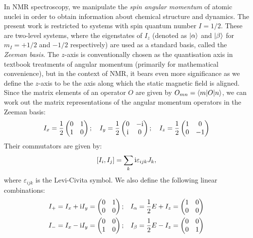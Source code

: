 In NMR spectroscopy, we manipulate the \textit{spin angular momentum} of atomic nuclei in order to obtain information about chemical structure and dynamics.
The present work is restricted to systems with spin quantum number $I = 1/2$.
These are two-level systems, where the eigenstates of $I_z$ (denoted as $\ket{\alpha}$ and $\ket{\beta}$ for $m_I = +1/2$ and $-1/2$ respectively) are used as a standard basis, called the \textit{Zeeman basis}.
The $z$-axis is conventionally chosen as the quantisation axis in textbook treatments of angular momentum (primarily for mathematical convenience), but in the context of NMR, it bears even more significance as we define the $z$-axis to be the axis along which the static magnetic field is aligned.
Since the matrix elements of an operator $O$ are given by $O_{mn} = \braket{m|O|n}$, we can work out the matrix representations of the angular momentum operators in the Zeeman basis:
\begin{equation}
    \label{eq:pauli}
    I_x = \frac{1}{2}\begin{pmatrix} 0 & 1 \\ 1 & 0 \end{pmatrix}; \quad 
    I_y = \frac{1}{2}\begin{pmatrix} 0 & -\mathrm{i} \\ \mathrm{i} & 0 \end{pmatrix}; \quad 
    I_z = \frac{1}{2}\begin{pmatrix} 1 & 0 \\ 0 & -1 \end{pmatrix}
\end{equation}
Their commutators are given by:
\begin{equation}
    \label{eq:angmom_commutators}
    [I_i, I_j] = \sum_{k} \mathrm{i} \varepsilon_{ijk}J_k,
\end{equation}
where $\varepsilon_{ijk}$ is the Levi-Civita symbol.
We also define the following linear combinations:
\begin{equation}
    \label{eq:other_single_spin_ops}
    \begin{aligned}
        I_+ = I_x + \mathrm{i} I_y &= \begin{pmatrix} 0 & 1 \\ 0 & 0 \end{pmatrix}; &
        I_\alpha = \frac{1}{2}E + I_z &= \begin{pmatrix} 1 & 0 \\ 0 & 0 \end{pmatrix} \\
        I_- = I_x - \mathrm{i} I_y &= \begin{pmatrix} 0 & 0 \\ 1 & 0 \end{pmatrix}; &
        I_\beta = \frac{1}{2}E - I_z &= \begin{pmatrix} 0 & 0 \\ 0 & 1 \end{pmatrix}
    \end{aligned}
\end{equation}
